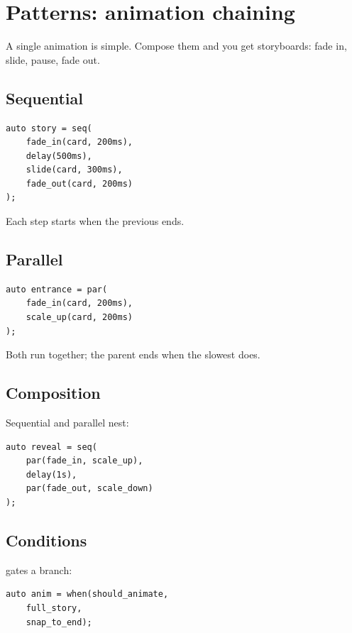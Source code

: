 \chapter{Patterns: animation chaining}
\label{ch:animchain}

\begin{aside}
A single animation is simple. Compose them and you get
storyboards: fade in, slide, pause, fade out.
\end{aside}

\section{Sequential}

\begin{lstlisting}
auto story = seq(
    fade_in(card, 200ms),
    delay(500ms),
    slide(card, 300ms),
    fade_out(card, 200ms)
);
\end{lstlisting}

Each step starts when the previous ends.

\section{Parallel}

\begin{lstlisting}
auto entrance = par(
    fade_in(card, 200ms),
    scale_up(card, 200ms)
);
\end{lstlisting}

Both run together; the parent ends when the slowest does.

\section{Composition}

Sequential and parallel nest:

\begin{lstlisting}
auto reveal = seq(
    par(fade_in, scale_up),
    delay(1s),
    par(fade_out, scale_down)
);
\end{lstlisting}

\section{Conditions}

 gates a branch:

\begin{lstlisting}
auto anim = when(should_animate,
    full_story,
    snap_to_end);
\end{lstlisting}

